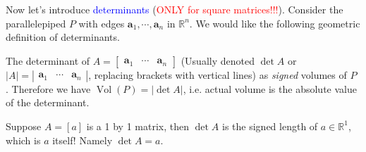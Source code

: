 \documentclass{beamer}
\theoremstyle{definition}
\theoremstyle{remark}
\DeclareMathOperator{\Vol}{Vol}
\begin{document}
\begin{frame}[t]
Now let's introduce \textcolor{blue}{determinants} (\textcolor{red}{ONLY for square matrices!!!}). Consider the parallelepiped $P$ with edges $\mathbf a_1,\cdots,\mathbf a_n$ in $\mathbb R^n$. We would like the following geometric definition of determinants.
\pause
\begin{definition}
The determinant of $A=\begin{bmatrix}
\mathbf a_1&\cdots&\mathbf a_n
\end{bmatrix}$ (Usually denoted $\det A$ or $|A|=\left|\begin{matrix}\mathbf a_1&\cdots&\mathbf a_n\end{matrix}\right|$, replacing brackets with vertical lines) as \textit{signed} volumes of $P$ . Therefore we have $\Vol(P)=|\det A|$, i.e. actual volume is the absolute value of the determinant.
\end{definition}
\pause
\begin{example}[$n=1$]
Suppose $A=[a]$ is a 1 by 1 matrix, then $\det A$ is the signed length of $a\in\mathbb R^1$, which is $a$ itself! Namely $\det A=a$.
\begin{center}
\end{center}
\end{example}
\end{frame}
\end{document}
